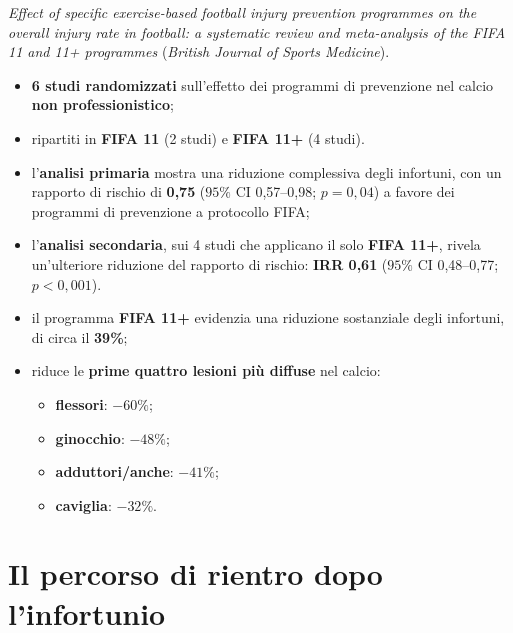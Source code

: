 \textit{Effect of specific exercise-based football injury prevention programmes on the overall
injury rate in football: a systematic review and meta-analysis of the FIFA 11 and 11+ programmes}
(\textit{British Journal of Sports Medicine}).

\begin{itemize}
  \item \textbf{6 studi randomizzati} sull'effetto dei programmi di prevenzione nel calcio
    \textbf{non professionistico};
  \item ripartiti in \textbf{FIFA 11} (2 studi) e \textbf{FIFA 11+} (4 studi).
\end{itemize}

\begin{itemize}
  \item l'\textbf{analisi primaria} mostra una riduzione complessiva degli infortuni, con un
    rapporto di rischio di \textbf{0,75} ($95\%$ CI 0,57--0,98; $p = 0{,}04$) a favore dei programmi
    di prevenzione a protocollo FIFA;
  \item l'\textbf{analisi secondaria}, sui 4 studi che applicano il solo \textbf{FIFA 11+}, rivela
    un'ulteriore riduzione del rapporto di rischio: \textbf{IRR 0,61} ($95\%$ CI 0,48--0,77;
    $p < 0{,}001$).
\end{itemize}

\begin{itemize}
  \item il programma \textbf{FIFA 11+} evidenzia una riduzione sostanziale degli infortuni, di circa
    il \textbf{39\%};
  \item riduce le \textbf{prime quattro lesioni più diffuse} nel calcio:
    \begin{itemize}
      \item \textbf{flessori}: $-60\%$;
      \item \textbf{ginocchio}: $-48\%$;
      \item \textbf{adduttori/anche}: $-41\%$;
      \item \textbf{caviglia}: $-32\%$.
    \end{itemize}
\end{itemize}

\section{Il percorso di rientro dopo l'infortunio}


